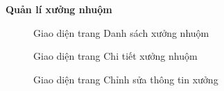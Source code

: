 \textbf{Quản lí xưởng nhuộm}

\begin{figure}[H]
    \begin{center}
        \caption{Giao diện trang Danh sách xưởng nhuộm}
        \label{result_danh_sach_xuong}
    \end{center}
\end{figure}

\begin{figure}[H]
    \begin{center}
        \caption{Giao diện trang Chi tiết xưởng nhuộm}
        \label{result_chi_tiet_xuong}
    \end{center}
\end{figure}

\begin{figure}[H]
    \begin{center}
        \caption{Giao diện trang Chỉnh sửa thông tin xưởng}
        \label{result_sua_thong_tin_xuong}
    \end{center}
\end{figure}

